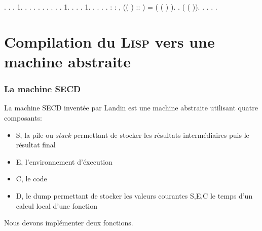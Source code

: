 \begin{coqdoccode}
\coqdocindent{0.50em}
 .  .\coqdoceol
\coqdocindent{0.50em}
 .\coqdoceol
\coqdocindent{0.50em}
   1. .  . .\coqdoceol
\coqdocemptyline
\coqdocindent{0.50em}
.\coqdoceol
\coqdocindent{0.50em}
 .  .\coqdoceol
\coqdocindent{0.50em}
 .  .\coqdoceol
\coqdocindent{0.50em}
 .\coqdoceol
\coqdocindent{0.50em}
   1. .  .\coqdoceol
\coqdocindent{0.50em}
 .\coqdoceol
\coqdocindent{0.50em}
   1. .  . .\coqdoceol
\coqdocemptyline
\coqdocindent{0.50em}
.\coqdoceol
\coqdocemptyline
\coqdocnoindent
{} : \coqdockw{\ensuremath{\forall}}  : ,  (( ) :: ) = ( ( ) ).\coqdoceol
\coqdocnoindent
{}.\coqdoceol
\coqdocnoindent
{} ( ( )).\coqdoceol
\coqdocnoindent
{} .\coqdoceol
\coqdocnoindent
{}.\coqdoceol
\coqdocnoindent
{}.\coqdoceol
\coqdocemptyline
\coqdocnoindent
{} .\coqdoceol
\end{coqdoccode}


\section{Compilation du \textsc{Lisp} vers une machine abstraite}
\subsubsection{La machine SECD}
La machine SECD inventée par Landin est une machine abstraite utilisant quatre composants:
\begin{itemize}
  \item S, la pile ou \textit{stack} permettant de stocker les résultats intermédiaires puis le résultat final
  \item E, l'environnement d'éxecution
  \item C, le code
  \item D, le dump permettant de stocker les valeurs courantes S,E,C le temps d'un calcul local d'une fonction
\end{itemize}
Nous devons implémenter deux fonctions.

